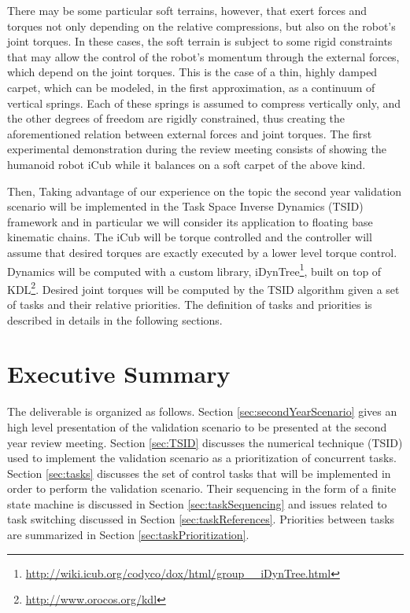 \documentclass[12pt,a4paper,twoside]{article}
\begin{document}
There may be some particular soft terrains, however, that exert forces and torques not only depending on the relative compressions, but also on the robot's joint torques. In these cases, the soft terrain is subject to some rigid constraints that may allow the control of the robot's momentum through the external forces, which depend on the joint torques. This is the case of a thin, highly damped carpet, which can be modeled, in the first approximation, as a continuum of vertical springs. Each of these springs is assumed to compress vertically only, and the other degrees of freedom are rigidly constrained, thus creating the aforementioned relation between external forces and joint torques. The first experimental demonstration during the review meeting consists of showing the humanoid robot iCub while it balances on a soft carpet of the above kind.


Then,  Taking advantage of our experience on the topic \cite{delPrete2013} the second year validation scenario will be implemented in the Task Space Inverse Dynamics (TSID) framework and in particular we will consider its application to floating base kinematic chains. The iCub will be torque controlled and the controller will assume that desired torques are exactly executed by a lower level torque control. Dynamics will be computed with a custom library, iDynTree\footnote{\url{http://wiki.icub.org/codyco/dox/html/group__iDynTree.html}}, built on top of KDL\footnote{\url{http://www.orocos.org/kdl}}. Desired joint torques will be computed by the TSID algorithm given a set of tasks and their relative priorities. The definition of tasks and priorities is described in details in the following sections. 

\section{Executive Summary}

The deliverable is organized as follows. Section \ref{sec:secondYearScenario} gives an high level presentation of the validation scenario to be presented at the second year review meeting. Section \ref{sec:TSID} discusses the numerical technique (TSID) used to implement the validation scenario as a prioritization of concurrent tasks. Section \ref{sec:tasks} discusses the set of control tasks that will be implemented in order to perform the validation scenario.  Their sequencing in the form of a finite state machine is discussed in Section \ref{sec:taskSequencing} and issues related to task switching discussed in Section \ref{sec:taskReferences}. Priorities between tasks are summarized in Section \ref{sec:taskPrioritization}.
\end{document}
